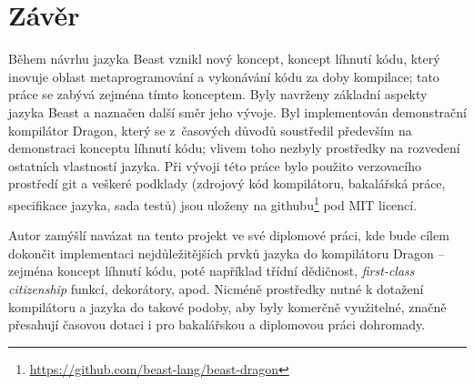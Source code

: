 \chapter{Závěr}
Během návrhu jazyka Beast vznikl nový koncept, koncept líhnutí kódu, který inovuje oblast metaprogramování a vykonávání kódu za doby kompilace; tato práce se zabývá zejména tímto konceptem. Byly navrženy základní aspekty jazyka Beast a naznačen další směr jeho vývoje. Byl implementován demonstrační kompilátor Dragon, který se z~časových důvodů soustředil především na demonstraci konceptu líhnutí kódu; vlivem toho nezbyly prostředky na rozvedení ostatních vlastností jazyka. Při vývoji této práce bylo použito verzovacího prostředí git a veškeré podklady (zdrojový kód kompilátoru, bakalářská práce, specifikace jazyka, sada testů) jsou uloženy na githubu\footnote{\url{https://github.com/beast-lang/beast-dragon}} pod MIT licencí.

Autor zamýšlí navázat na tento projekt ve své diplomové práci, kde bude cílem dokončit implementaci nejdůležitějších prvků jazyka do kompilátoru Dragon -- zejména koncept líhnutí kódu, poté například třídní dědičnost, \textit{first-class citizenship} funkcí, dekorátory, apod. Nicméně prostředky nutné k dotažení kompilátoru a jazyka do takové podoby, aby byly komerčně využitelné, značně přesahují časovou dotaci i pro bakalářskou a diplomovou práci dohromady.
